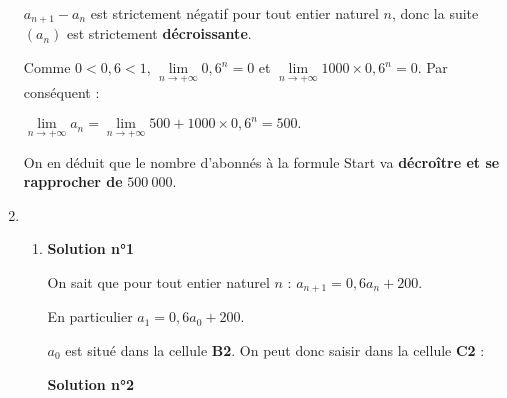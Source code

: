 \begin{corrige}
\begin{enumerate}
          \par
          $a_{n+1}-a_n$ est strictement négatif pour tout entier naturel $n$, donc la suite $(a_n)$ est strictement \textbf{décroissante}.
          \par
          \par
          Comme $0 < 0,6 < 1$, ${\lim\limits_{n \rightarrow +\infty}0,6^n=0}$ et ${\lim\limits_{n \rightarrow +\infty}1000 \times 0,6^n=0}$. Par conséquent :
          \par
          $\lim\limits_{n \rightarrow +\infty}a_n = \lim\limits_{n \rightarrow +\infty}500+1000 \times 0,6^n =500.$
          \par
          On en déduit que le nombre d'abonnés à la formule \og Start \fg{} va \textbf{décroître et se rapprocher de} $500~000$.
          \item %
          \begin{enumerate}[label=\alph*.]
               \item %
               \textbf{Solution n°1}
               \par
               On sait que pour tout entier naturel $n$ : $a_{n+1}=0,6a_n+200$.
               \par
               En particulier $a_1=0,6a_0+200$.
               \par
               $a_0$ est situé dans la cellule \textbf{B2}. On peut donc saisir dans la cellule \textbf{C2} :
               \par
               \begin{center}
               \end{center}
               \par
               \textbf{Solution n°2}
               \par

\end{enumerate}
\end{enumerate}
\end{corrige}
